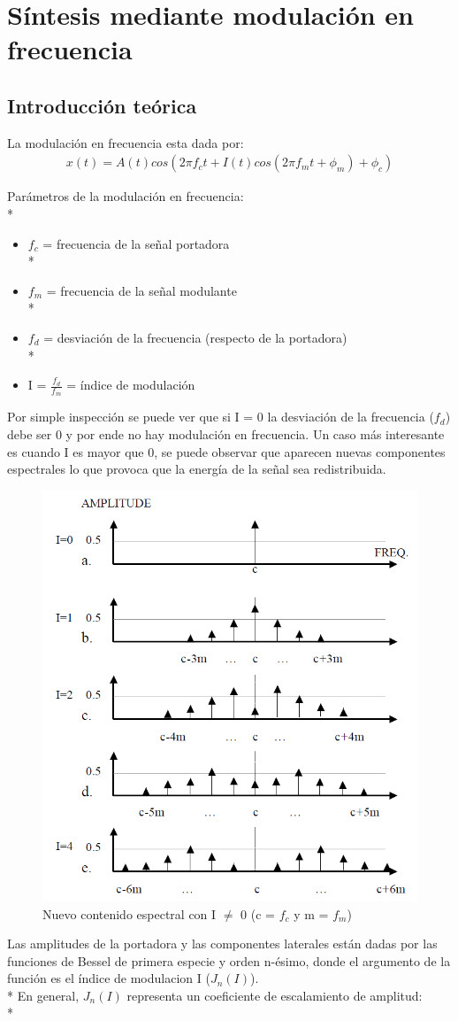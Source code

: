 \documentclass[assd_tp2_main.tex]{subfiles}
\begin{document}
\section{Síntesis mediante modulación en frecuencia}
\subsection{Introducción teórica}
La modulación en frecuencia esta dada por:
\begin{eqnarray*}
\textstyle x(t)=A(t)cos(2\pi f_c t+I(t)cos(2\pi f_mt+\phi_m)+\phi_c)
\end{eqnarray*}
\par
Parámetros de la modulación en frecuencia:\\*
\begin{itemize}
\item $f_c$ = frecuencia de la señal portadora\\*
\item $f_m$ = frecuencia de la señal modulante\\*
\item $f_d$ = desviación de la frecuencia (respecto de la portadora)\\*
\item I = $\displaystyle \frac{f_d}{f_m}$ = índice de modulación
\end{itemize}

Por simple inspección se puede ver que si I = 0 la desviación de la frecuencia ($f_d$) debe ser 0 y por ende no hay  modulación en frecuencia. Un caso más interesante es cuando I es mayor que 0, se puede observar que aparecen nuevas componentes espectrales lo que provoca que la energía de la señal sea redistribuida.  
\begin{figure}[H]
\centering
\includegraphics[width=0.4\linewidth]{graficos/EJ4/nuevasfreqs.png}
\caption{Nuevo contenido espectral con I $\neq$ 0 (c = $f_c$ y  m = $f_m$)}
\label{fig:nuevasfreqs}
\end{figure}
Las amplitudes de la portadora y las componentes laterales están dadas por las funciones de Bessel de primera especie y orden n-ésimo,
donde el argumento de la función es el índice de modulacion I ($J_{n}(I)$). \\*
En general, $J_{n}(I)$ representa un coeficiente de escalamiento de amplitud: \\*
\end{document}
